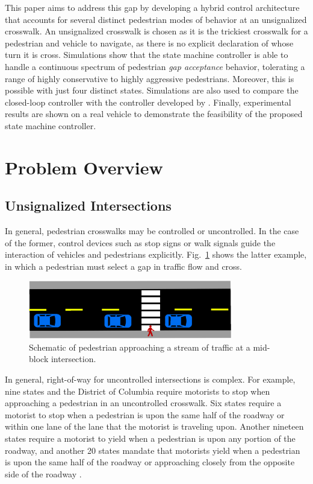 \documentclass[letterpaper, 10 pt, conference]{ieeeconf}  %
\begin{document}
This paper aims to address this gap by developing a hybrid control architecture that accounts for several distinct pedestrian modes of behavior at an unsignalized crosswalk. An unsignalized crosswalk is chosen as it is the trickiest crosswalk for a pedestrian and vehicle to navigate, as there is no explicit declaration of whose turn it is cross. Simulations show that the state machine controller is able to handle a continuous spectrum of pedestrian \textit{gap acceptance} behavior, tolerating a range of highly conservative to highly aggressive pedestrians. Moreover, this is possible with just four distinct states. Simulations are also used to compare the closed-loop controller with the controller developed by \cite{Thornton2018}. Finally, experimental results are shown on a real vehicle to demonstrate the feasibility of the proposed state machine controller. 


\section{Problem Overview}

\subsection{Unsignalized Intersections}

In general, pedestrian crosswalks may be controlled or uncontrolled. In the case of the former, control devices such as stop signs or walk signals guide the interaction of vehicles and pedestrians explicitly. Fig.~\ref{fig:schematic} shows the latter example, in which a pedestrian must select a gap in traffic flow and cross.   

\begin{figure}
\centering
\includegraphics[width=3.5in]{figures/example.eps}
\caption{Schematic of pedestrian approaching a stream of traffic at a mid-block intersection.}
\label{fig:schematic}
\end{figure}

In general, right-of-way for uncontrolled intersections is complex. For example, nine states and the District of Columbia require motorists to stop when approaching a pedestrian in an uncontrolled crosswalk. Six states require a motorist to stop when a pedestrian is upon the same half of the roadway or within one lane of the lane that the motorist is traveling upon. Another nineteen states require a motorist to yield when a pedestrian is upon any portion of the roadway, and another 20 states mandate that motorists yield when a pedestrian is upon the same half of the roadway or approaching closely from the opposite side of the roadway \cite{NCSL}.
\end{document}
